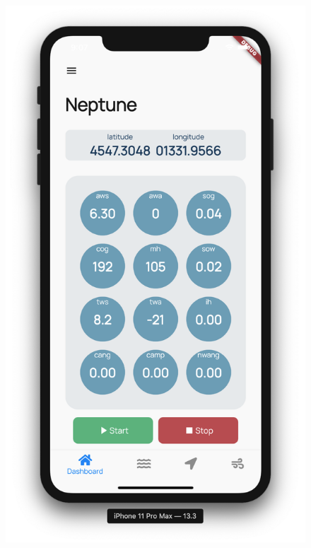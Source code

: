 \documentclass[12pt,italian,oneside]{report}
\newcounter{cap}
\begin{document}
\begin{firstheadlineitemize}
\begin{figure}[htp]
\begin{minipage}[b]{.3\columnwidth}
\begin{secondheadlineitemize}
\end{secondheadlineitemize}
\end{minipage}
\begin{minipage}[b]{.5\columnwidth}
	\includegraphics[scale=0.31]{dashboard}

\end{minipage}
\end{figure}
\end{firstheadlineitemize}
\end{document}
